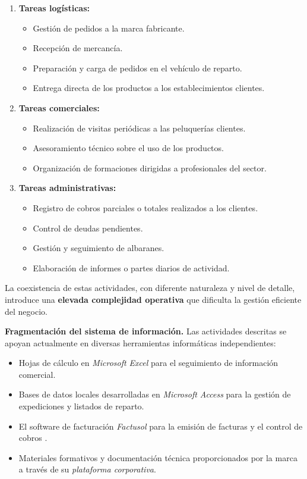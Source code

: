 \begin{enumerate}[label=\textbf{\arabic*.}, leftmargin=1.2cm, itemsep=0.3em, topsep=0.25em]
  \item \textbf{Tareas logísticas:}
  \begin{itemize}[topsep=0.1em, itemsep=0.05em]
    \item Gestión de pedidos a la marca fabricante.
    \item Recepción de mercancía.
    \item Preparación y carga de pedidos en el vehículo de reparto.
    \item Entrega directa de los productos a los establecimientos clientes.
  \end{itemize}

  \item \textbf{Tareas comerciales:}
  \begin{itemize}[topsep=0.1em, itemsep=0.05em]
    \item Realización de visitas periódicas a las peluquerías clientes.
    \item Asesoramiento técnico sobre el uso de los productos.
    \item Organización de formaciones dirigidas a profesionales del sector.
  \end{itemize}

  \item \textbf{Tareas administrativas:}
  \begin{itemize}[topsep=0.1em, itemsep=0.05em]
    \item Registro de cobros parciales o totales realizados a los clientes.
    \item Control de deudas pendientes.
    \item Gestión y seguimiento de albaranes.
    \item Elaboración de informes o partes diarios de actividad.
  \end{itemize}
\end{enumerate}

La coexistencia de estas actividades, con diferente naturaleza y nivel de detalle, introduce una \textbf{elevada complejidad operativa} que dificulta la gestión eficiente del negocio.

\noindent\textbf{Fragmentación del sistema de información.} Las actividades descritas se apoyan actualmente en diversas herramientas informáticas independientes:

\begin{itemize}[topsep=0.2em, itemsep=0.1em]
  \item Hojas de cálculo en \textit{Microsoft Excel} para el seguimiento de información comercial.
  \item Bases de datos locales desarrolladas en \textit{Microsoft Access} para la gestión de expediciones y listados de reparto.
  \item El software de facturación \textit{Factusol} para la emisión de facturas y el control de cobros \citep{sdelsol-factusol}.
  \item Materiales formativos y documentación técnica proporcionados por la marca a través de su \textit{plataforma corporativa}.
\end{itemize}

